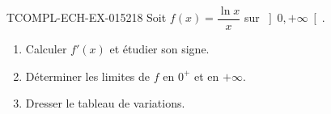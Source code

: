 \begin{exercice}{TCOMPL-ECH-EX-015}{2}{18}
Soit $f(x) = \dfrac{\ln x}{x}$ sur $\left]0, +\infty\right[$.
\begin{enumerate}
  \item Calculer $f'(x)$ et étudier son signe.
  \item Déterminer les limites de $f$ en $0^+$ et en $+\infty$.
  \item Dresser le tableau de variations.
\end{enumerate}

\end{exercice}
